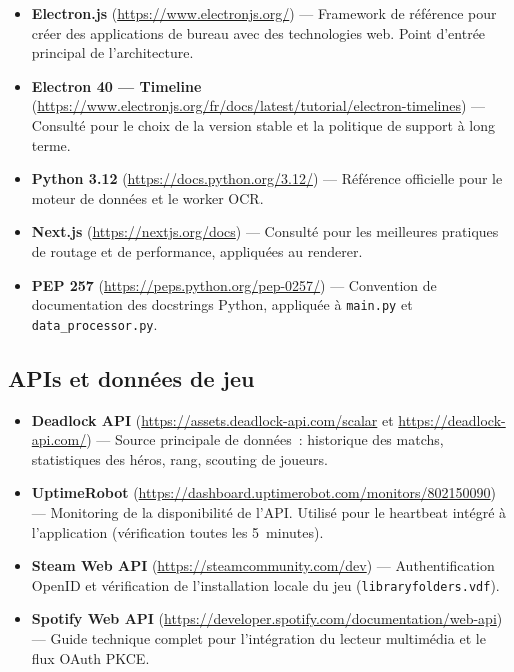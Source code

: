 \documentclass[12pt,a4paper]{article}
\begin{document}
\begin{itemize}
  \item \textbf{Electron.js}
    (\url{https://www.electronjs.org/}) --- Framework de référence pour
    créer des applications de bureau avec des technologies web. Point
    d'entrée principal de l'architecture.

  \item \textbf{Electron 40 --- Timeline}
    (\url{https://www.electronjs.org/fr/docs/latest/tutorial/electron-timelines})
    --- Consulté pour le choix de la version stable et la politique de
    support à long terme.

  \item \textbf{Python 3.12}
    (\url{https://docs.python.org/3.12/}) --- Référence officielle pour
    le moteur de données et le worker OCR.

  \item \textbf{Next.js}
    (\url{https://nextjs.org/docs}) --- Consulté pour les meilleures
    pratiques de routage et de performance, appliquées au renderer.

  \item \textbf{PEP 257}
    (\url{https://peps.python.org/pep-0257/}) --- Convention de
    documentation des docstrings Python, appliquée à \texttt{main.py}
    et \texttt{data\_processor.py}.
\end{itemize}

\subsection{APIs et données de jeu}

\begin{itemize}
  \item \textbf{Deadlock API}
    (\url{https://assets.deadlock-api.com/scalar} et
     \url{https://deadlock-api.com/}) --- Source principale de données~:
    historique des matchs, statistiques des héros, rang, scouting de
    joueurs.

  \item \textbf{UptimeRobot}
    (\url{https://dashboard.uptimerobot.com/monitors/802150090}) ---
    Monitoring de la disponibilité de l'API. Utilisé pour le heartbeat
    intégré à l'application (vérification toutes les 5~minutes).

  \item \textbf{Steam Web API}
    (\url{https://steamcommunity.com/dev}) --- Authentification OpenID
    et vérification de l'installation locale du jeu
    (\texttt{libraryfolders.vdf}).

  \item \textbf{Spotify Web API}
    (\url{https://developer.spotify.com/documentation/web-api}) ---
    Guide technique complet pour l'intégration du lecteur multimédia
    et le flux OAuth PKCE.
\end{itemize}
\end{document}
